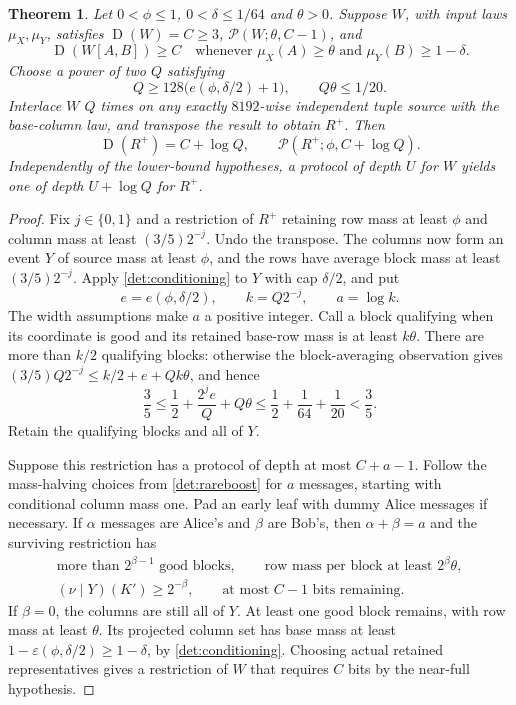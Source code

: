 \documentclass[11pt]{article} \usepackage[utf8]{inputenc}
\theoremstyle{plain} \newtheorem{theorem}{Theorem}[section]
\theoremstyle{definition} \newaliascnt{definition}{theorem}
\newcommand{\D}{\operatorname{D}}
\newcommand{\RP}[3]{\mathcal{P}(#1;#2,#3)}
\begin{document}
\begin{theorem}\label{det:restore}
Let $0<\phi\le1$, $0<\delta\le1/64$ and $\theta>0$. Suppose $W$, with input laws
$\mu_X,\mu_Y$, satisfies $\D(W)=C\ge3$, $\RP{W}{\theta}{C-1}$, and
\[
\D(W[A,B])\ge C \quad\text{whenever }\mu_X(A)\ge\theta
\text{ and }\mu_Y(B)\ge1-\delta.
\]
Choose a power of two $Q$ satisfying
\[
Q\ge128\bigl(e(\phi,\delta/2)+1\bigr), \qquad Q\theta\le1/20.
\]
Interlace $W$ $Q$ times on any exactly $8192$-wise independent tuple source with
the base-column law, and transpose the result to obtain $R^+$. Then
\[
\D(R^+)=C+\log Q, \qquad \RP{R^+}{\phi}{C+\log Q}.
\]
Independently of the lower-bound hypotheses, a protocol of depth $U$ for $W$
yields one of depth $U+\log Q$ for $R^+$.
\end{theorem}
\begin{proof}
Fix $j\in\{0,1\}$ and a restriction of $R^+$ retaining row mass at least
$\phi$ and column mass at least $(3/5)2^{-j}$. Undo the transpose. The
columns now form an event $Y$ of source mass at least $\phi$, and the rows
have average block mass at least $(3/5)2^{-j}$. Apply
\cref{det:conditioning} to $Y$ with cap $\delta/2$, and put
\[
e=e(\phi,\delta/2),\qquad k=Q2^{-j},\qquad a=\log k.
\]
The width assumptions make $a$ a positive integer. Call a block qualifying
when its coordinate is good and its retained base-row mass is at least
$k\theta$. There are more than $k/2$ qualifying blocks: otherwise the
block-averaging observation gives
$(3/5)Q2^{-j}\le k/2+e+Qk\theta$, and hence
\[
\frac35\le\frac12+\frac{2^je}{Q}+Q\theta
\le\frac12+\frac1{64}+\frac1{20}<\frac35.
\]
Retain the qualifying blocks and all of $Y$.

Suppose this restriction has a protocol of depth at most $C+a-1$.
Follow the mass-halving choices from \cref{det:rareboost} for $a$ messages,
starting with conditional column mass one. Pad an early leaf with dummy
Alice messages if necessary. If $\alpha$ messages are Alice's and $\beta$
are Bob's, then $\alpha+\beta=a$ and the surviving restriction has
\[
\begin{gathered}
\text{more than }2^{\beta-1}\text{ good blocks},\qquad
\text{row mass per block at least }2^\beta\theta,\\
(\nu\mid Y)(K')\ge2^{-\beta},\qquad
\text{at most }C-1\text{ bits remaining}.
\end{gathered}
\]
If $\beta=0$, the columns are still all of $Y$. At least one good block
remains, with row mass at least $\theta$. Its projected column set has base
mass at least $1-\varepsilon(\phi,\delta/2)\ge1-\delta$, by
\cref{det:conditioning}. Choosing actual retained representatives gives a
restriction of $W$ that requires $C$ bits by the near-full hypothesis.


\end{proof}
\end{document}
